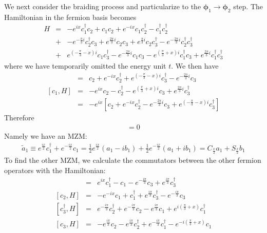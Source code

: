 We next consider the braiding process and particularize to the $\boldsymbol{\phi}_1\rightarrow \boldsymbol{\phi}_2$ step. The Hamiltonian in the fermion basis becomes
\begin{eqnarray}
H &=& - e^{ix}c_1^\dag c_2 + c_1 c_2 + e^{-ix}c_1 c_2^\dag - c_1^\dag c_2^\dag \\\nonumber
&+&  - e^{-\frac{\pi}{3}i} c_2^\dag c_3 + e^{\frac{2\pi}{3}i} c_2 c_3 + e^{\frac{\pi}{3}i}c_2 c_3^\dag - e^{-\frac{2\pi}{3}i} c_2^\dag c_3^\dag \\\nonumber
&+&  e^{\left(-\frac{\pi}{3}-x\right)i} c_1 c_3^\dag  - e^{-\frac{2\pi}{3}i} c_1 c_3  - e^{\left(\frac{\pi}{3}+x\right)i} c_1^\dag c_3  + e^{\frac{2\pi}{3}i}  c_1^\dag c_3^\dag
\end{eqnarray}
where we have temporarily omitted the energy unit $t$. We then have
\begin{eqnarray}
	[c_1^\dag, H] &=& c_2 + e^{-ix} c_2^\dag + e^{\left(-\frac{\pi}{3}-x\right)i} c_3^\dag - e^{-\frac{2\pi}{3}i} c_3 \\\nonumber
	[c_1, H] &=& -e^{ix}c_2 - c_2^\dag - e^{\left(\frac{\pi}{3}+x\right)i} c_3 + e^{\frac{2\pi}{3}i} c_3^\dag\\\nonumber
	&=& -e^{ix} \left[ c_2 + e^{-i x}c_2^\dag - e^{-\frac{2\pi}{3}i} c_3 +  e^{\left(-\frac{\pi}{3}-x\right)i} c_3^\dag \right]
\end{eqnarray}
Therefore
\begin{eqnarray}
	[e^{\frac{ix}{2}}c_1^\dag + e^{-\frac{ix}{2}} c_1, H] = 0
\end{eqnarray}
Namely we have an MZM:
\begin{eqnarray}
	\tilde{a}_1 \equiv e^{\frac{ix}{2}}c_1^\dag + e^{-\frac{ix}{2}} c_1 = \frac{1}{2}e^{\frac{ix}{2}} (a_1 - ib_1) + \frac{1}{2}e^{-\frac{ix}{2}} (a_1 + ib_1) = C_{\frac{x}{2}} a_1 + S_{\frac{x}{2}} b_1
\end{eqnarray}
To find the other MZM, we calculate the commutators between the other fermion operators with the Hamiltonian:
\begin{eqnarray}
	[c_2^\dag, H] &=& e^{ix} c_1^\dag - c_1 - e^{-\frac{i\pi}{3}} c_3 + e^{\frac{i\pi}{3}} c_3^\dag \\\nonumber
	[c_2, H] &=& -e^{-ix} c_1 + c_1^\dag + e^{\frac{i\pi}{3}} c_3^\dag - e^{-\frac{i\pi}{3}} c_3\\\nonumber
	[c_3^\dag, H] &=& e^{-\frac{i\pi}{3}}c_2^\dag + e^{-\frac{i\pi}{3}} c_2 - e^{\frac{i\pi}{3}} c_1 + e^{i\left(\frac{\pi}{3} + x \right)}c_1^\dag \\\nonumber
	[c_3, H]	&=& -e^{\frac{i\pi}{3}}c_2 - e^{\frac{i\pi}{3}} c_2^\dag + e^{-\frac{i\pi}{3}} c_1^\dag - e^{-i\left(\frac{\pi}{3} + x \right)}c_1
\end{eqnarray}
